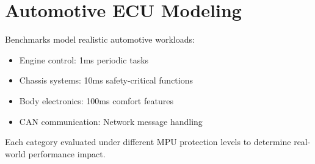 \section{Automotive ECU Modeling}

Benchmarks model realistic automotive workloads:
\begin{itemize}
    \item Engine control: 1ms periodic tasks
    \item Chassis systems: 10ms safety-critical functions
    \item Body electronics: 100ms comfort features
    \item CAN communication: Network message handling
\end{itemize}

Each category evaluated under different MPU protection levels to determine real-world performance impact.